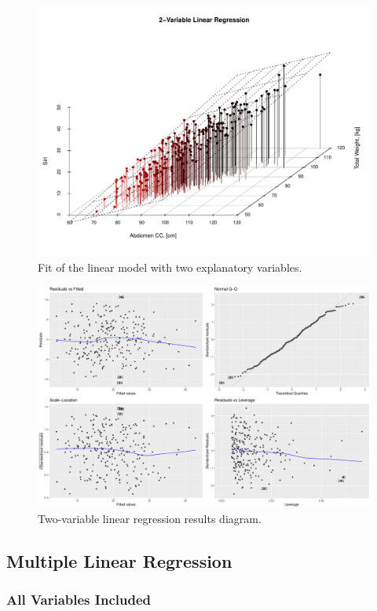 \documentclass[11pt,american,american]{article}
\begin{document}
\vspace*{\fill}
\begin{figure}[H]
	\centering
	\includegraphics[width=0.75\linewidth]{Images/FIGURES/3d_linear_regression}
	\caption{Fit of the linear model with two explanatory variables.}
	\label{fig:3d_linear_regression}
\end{figure}

\begin{figure}[H]
	\centering
	\includegraphics[width=0.95\linewidth]{Images/FIGURES/2var_linear_regression}
	\caption{Two-variable linear regression results diagram.}
	\label{fig:2var_linear_regression}
\end{figure}
\vspace*{\fill}

\newpage

\subsection{Multiple Linear Regression}

\subsubsection{All Variables Included}
\end{document}
